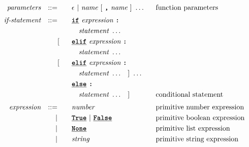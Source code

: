 \begin{alignat*}{9}
&& \textit{parameters}   && ::= &\quad &&  \epsilon\ | \  \textit{name} \ 
                                                   [\ \textbf{\texttt{,}} \ \textit{name}\ ]\ \ldots
                                                            && \textrm{function parameters}   \\[1mm]
&& \textit{if-statement} && ::= &\quad &&  \textbf{\texttt{\underline{if}}}\ \textit{expression} \ 
                                           \textbf{\texttt{:}}  \\
&&                       &&     &\quad && \quad \textit{statement} \ \ldots \quad
                                                           &&  \\  
&&                       &&     &      [&& \textbf{\texttt{\underline{elif}}} \ \textit{expression} \
                                          \textbf{\texttt{:}} \\ 
&&                       &&     &\quad && \quad \textit{statement} \ \ldots \quad
                                                           &&  \\
&&                       &&     &      [&& \textbf{\texttt{\underline{elif}}} \ \textit{expression} \
                                          \textbf{\texttt{:}} \\ 
&&                       &&     &\quad && \quad \textit{statement} \ \ldots \quad ] \ \ldots \quad 
                                                           &&  \\     
&&                       &&     &      && \textbf{\texttt{\underline{else}}}\
                                          \textbf{\texttt{:}} \\
&&                       &&     &\quad && \quad \textit{statement} \ \ldots \quad ]
                                                           && \textrm{conditional statement}  \\[1mm]
&& \textit{expression}   && ::= &\quad &&  \textit{number}   && \textrm{primitive number expression}\\
&&                       && |   &\quad && \textbf{\texttt{\underline{True}}}\ |\ \textbf{\texttt{\underline{False}}}
                                                           && \textrm{primitive boolean expression}\\
&&                       && |   &\quad &&  \textbf{\texttt{\underline{None}}} \   && \textrm{primitive list expression}\\
&&                       && |   &\quad &&  \textit{string}   && \textrm{primitive string expression}\\

\end{alignat*}
